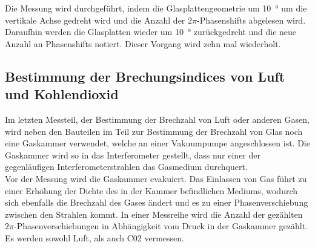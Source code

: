 Die Messung wird durchgeführt, indem die Glasplattengeometrie um 
\SI{10}{\degree} um die vertikale Achse gedreht wird und die Anzahl 
der $2\pi$-Phasenshifts abgelesen wird. Daraufhin werden die 
Glasplatten wieder um \SI{10}{\degree} zurückgedreht und die neue 
Anzahl an Phasenshifts notiert. Dieser Vorgang wird zehn mal 
wiederholt.
%
\subsection{Bestimmung der Brechungsindices von Luft und Kohlendioxid}
%
Im letzten Messteil, der Bestimmung der Brechzahl von Luft oder 
anderen Gasen, wird neben den Bauteilen im Teil zur Bestimmung 
der Brechzahl von Glas noch eine Gaskammer verwendet, welche 
an einer Vakuumpumpe angeschlossen ist. Die Gaskammer wird so 
in das Interferometer gestellt, dass nur einer der gegenläufigen 
Interferometerstrahlen das Gasmedium durchquert.\\
Vor der Messung wird die Gaskammer evakuiert. Das Einlassen von 
Gas führt zu einer Erhöhung der Dichte des in der Kammer befindlichen 
Mediums, wodurch sich ebenfalls die Brechzahl des Gases ändert und es 
zu einer Phasenverschiebung zwischen den Strahlen kommt.
In einer Messreihe wird die Anzahl der gezählten 
$2\pi$-Phasenverschiebungen in Abhängigkeit vom Druck in der 
Gaskammer gezählt.\\
Es werden sowohl Luft, als auch C02 vermessen.
%
